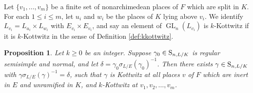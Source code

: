 \documentclass[11pt, reqno]{amsart}
\numberwithin{equation}{subsection}
\theoremstyle{plain}
\newtheorem{proposition}{Proposition}[subsection]
\theoremstyle{definition}
\renewcommand{\S}{\textnormal{S}}
\DeclareMathOperator{\GL}{GL}
\begin{document}
Let $\{v_1, \dots, v_m\}$ be a finite set of 
nonarchimedean places
of $F$ which are split in $K$. For each $1 \le i \le m$, 
let $u_i$ and $w_i$ be the places of $K$ lying above 
$v_i$. We identify $L_{v_i} = L_{u_i} \times L_{w_i}$
with $E_{v_i} \times E_{v_i}$, and say an
element of $\GL_n(L_{v_i})$ is $k$-Kottwitz if it is
$k$-Kottwitz in the sense of Definition 
\ref{def:kkottwitz}.

\begin{proposition}
\label{prop:globalkottwitz}
Let $k \ge 0$ be an integer.
Suppose $\gamma_0 \in \S_{n,L/K}$ is
regular semisimple and normal, and let $\delta
= \gamma_0\sigma_{L/E}(\gamma_0)^{-1}$. 
Then there exists $\gamma \in \S_{n,L/K}$ with
$\gamma\sigma_{L/E}(\gamma)^{-1} = \delta$,
such that $\gamma$ is Kottwitz at all places $v$ of $F$ 
which are inert in $E$ and unramified in $K$, and
$k$-Kottwitz at $v_1, v_2, \dots, v_m$.
\end{proposition}
\end{document}
